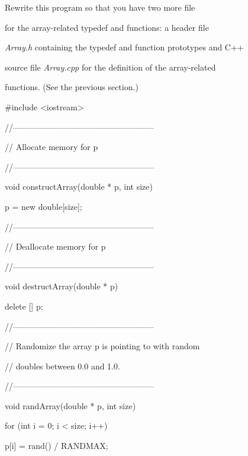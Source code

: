 Rewrite this program so that you have two more file

for the array-related typedef and functions: a header file

\textit{Array.h} containing the typedef and function prototypes and C++

source file \textit{Array.cpp} for the definition of the array-related

functions. (See the previous section.)



\begin{consolethree}[escapeinside=||]

#include <iostream>



//---------------------------------------------------

// Allocate memory for p

//---------------------------------------------------

void constructArray(double * p, int size)

{

    p = new double[size];

}



//---------------------------------------------------

// Deallocate memory for p

//---------------------------------------------------

void destructArray(double * p)

{

    delete [] p;

}



//---------------------------------------------------

// Randomize the array p is pointing to with random

// doubles between 0.0 and 1.0.

//---------------------------------------------------

void randArray(double * p, int size)

{

    for (int i = 0; i < size; i++)

    {

        p[i] = rand() / RANDMAX;

    }

}




\end{consolethree}
